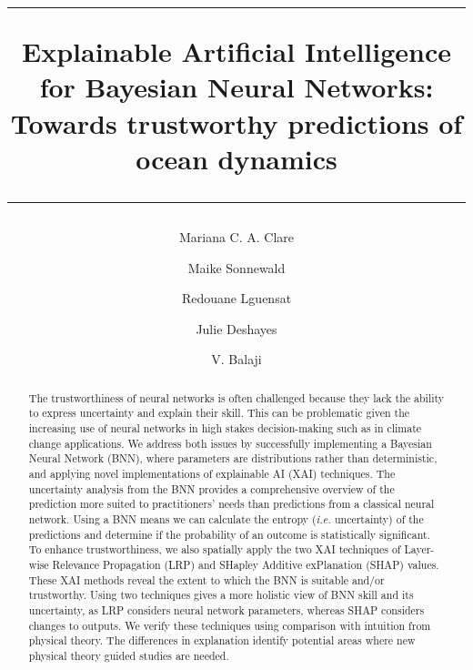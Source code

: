 \documentclass[a4paper]{article}
\begin{document}
\title{\hrule

\vspace{10pt}

\Large \textbf{Explainable Artificial Intelligence for Bayesian Neural Networks: Towards  trustworthy predictions of ocean dynamics}

\vspace{10pt}

\hrule}


\author[1]{\large Mariana C. A. Clare}
\author[2,3,4]{\large Maike Sonnewald}
\author[5]{\large Redouane Lguensat}
\author[6]{\large Julie Deshayes}
\author[2,3,7]{\large V. Balaji}



\date{}
\maketitle

\begin{abstract}
The trustworthiness of neural networks is often challenged because they lack the ability to express uncertainty and explain their skill. This can be problematic given the increasing use of neural networks in high stakes decision-making such as in climate change applications. We address both issues by successfully implementing a Bayesian Neural Network (BNN), where parameters are distributions rather than deterministic, and applying novel implementations of explainable AI (XAI) techniques. The uncertainty analysis from the BNN provides a comprehensive overview of the prediction more suited to practitioners' needs than predictions from a classical neural network. Using a BNN means we can calculate the entropy (\textit{i.e.} uncertainty) of the predictions and determine if the probability of an outcome is statistically significant. To enhance trustworthiness, we also spatially apply the two XAI techniques of Layer-wise Relevance Propagation (LRP) and SHapley Additive exPlanation (SHAP) values. These XAI methods reveal the extent to which the BNN is suitable and/or trustworthy. Using two techniques gives a more holistic view of BNN skill and its uncertainty, as LRP considers neural network parameters, whereas SHAP considers changes to outputs. We verify these techniques using comparison with intuition from physical theory. The differences in explanation identify potential areas where new physical theory guided studies are needed.
\end{abstract}
\end{document}
